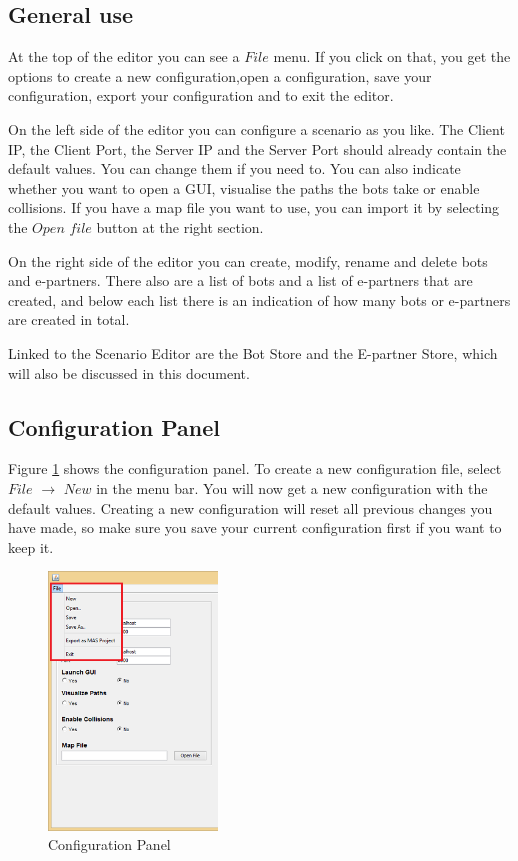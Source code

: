 \documentclass[11pt,a4paper]{article}
\begin{document}
\subsection{General use}
At the top of the editor you can see a $File$ menu. If you click on that, you get the options to create a new configuration,open a configuration, save your configuration, export your configuration and to exit the editor.

On the left side of the editor you can configure a scenario as you like. The Client IP, the Client Port, the Server IP and the Server Port should already contain the default values. You can change them if you need to. You can also indicate whether you want to open a GUI, visualise the paths the bots take or enable collisions. If you have a map file you want to use, you can import it by selecting the $Open$ $file$ button at the right section.

On the right side of the editor you can create, modify, rename and delete bots and e-partners. There also are a list of bots and a list of e-partners that are created, and below each list there is an indication of how many bots or e-partners are created in total.

Linked to the Scenario Editor are the Bot Store and the E-partner Store, which will also be discussed in this document.

\pagebreak
\subsection{Configuration Panel}
Figure \ref{fig:ConfigPanel} shows the configuration panel.
To create a new configuration file, select $File$ $\to$ $New$ in the menu bar. You will now get a new configuration with the default values. Creating a new configuration will reset all previous changes you have made, so make sure you save your current configuration first if you want to keep it.

\begin{figure}[h]
\begin{center}
\includegraphics[width=0.4\textwidth]{config.png}
\end{center}
\caption{Configuration Panel}\label{fig:ConfigPanel}
\end{figure}
\end{document}
